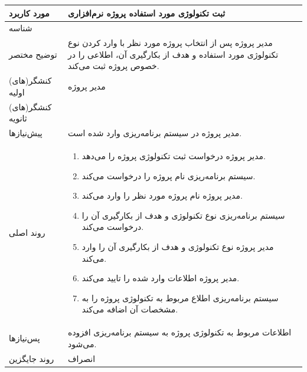 \begin{table}[H]
	\centering
	\begin{tabular}{|p{3cm}|p{10cm}|}
		\hline
		
		
		مورد کاربرد	& ثبت تکنولوژی مورد استفاده پروژه نرم‌افزاری  \\
		\hline
		
		شناسه & 
		\stepcounter{usecase_ID}
		
		\arabic{usecase_ID} \\
		
		\hline
		
		توضیح مختصر & مدیر پروژه پس از انتخاب پروژه مورد نظر با وارد کردن نوع تکنولوژی مورد استفاده و هدف از بکارگیری آن، اطلاعی را در خصوص پروژه ثبت می‌کند. \\
		\hline
		
		کنشگر(های) اولیه& مدیر پروژه \\
		\hline
		
		کنشگر(های) ثانویه&  \\
		\hline
		
		پیش‌نیازها
		& مدیر پروژه در سیستم برنامه‌ریزی وارد شده است.\\
		
		\hline
		
		
		روند اصلی &
		\begin{enumerate}[topsep=0cm,leftmargin=0.5cm]
			\item مدیر پروژه درخواست ثبت تکنولوژی پروژه را می‌دهد.
			\item سیستم برنامه‌ریزی نام پروژه را درخواست می‌کند.
			\item مدیر پروژه نام پروژه مورد نظر را وارد می‌کند.
			\item سیستم برنامه‌ریزی نوع تکنولوژی و هدف از بکارگیری آن را درخواست می‌کند.
			\item مدیر پروژه نوع تکنولوژی و هدف از بکارگیری آن را وارد می‌کند.
			\item مدیر پروژه اطلاعات وارد شده را تایید می‌کند.
			\item سیستم برنامه‌ریزی اطلاع مربوط به تکنولوژی پروژه را به مشخصات آن اضافه می‌کند.
		\end{enumerate}	\\
		\hline
		
		پس‌نیازها &
		اطلاعات مربوط به تکنولوژی پروژه به سیستم برنامه‌ریزی افزوده می‌شود. \\
		\hline
		
		روند جایگزین
		& انصراف \\
		\hline
		
	\end{tabular}
\end{table}



